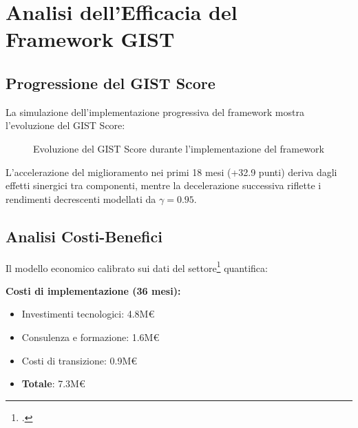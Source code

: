 \section{Analisi dell'Efficacia del Framework GIST}
\label{sec:efficacia_gist}

\subsection{Progressione del GIST Score}
\label{subsec:progressione_gist}

La simulazione dell'implementazione progressiva del framework mostra l'evoluzione del GIST Score:

\begin{figure}[htbp]
\centering
{}
\caption{Evoluzione del GIST Score durante l'implementazione del framework}
\label{fig:gist_evolution}
\end{figure}

L'accelerazione del miglioramento nei primi 18 mesi (+32.9 punti) deriva dagli effetti sinergici tra componenti, mentre la decelerazione successiva riflette i rendimenti decrescenti modellati da $\gamma=0.95$.

\subsection{Analisi Costi-Benefici}
\label{subsec:costi_benefici}

Il modello economico calibrato sui dati del settore\footcite{mckinsey2023} quantifica:

\textbf{Costi di implementazione (36 mesi):}
\begin{itemize}
\item Investimenti tecnologici: 4.8M€
\item Consulenza e formazione: 1.6M€
\item Costi di transizione: 0.9M€
\item \textbf{Totale}: 7.3M€
\end{itemize}

